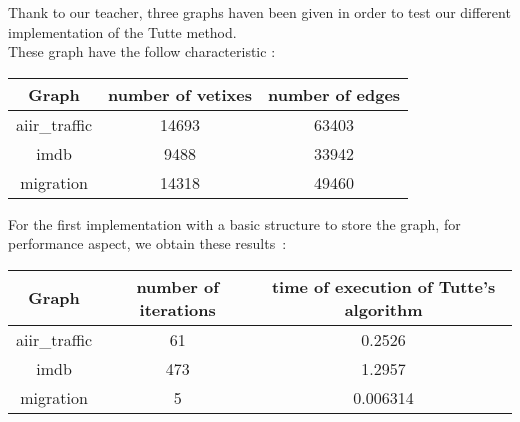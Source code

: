 
Thank to our teacher, three graphs haven been given in order to test our
different implementation of the Tutte method.\\

These graph have the follow characteristic :

\begin{center}
\begin{tabular}{|c|c|c|}
\hline
Graph & number of vetixes & number of edges \\
\hline
aiir\_traffic & 14693 & 63403\\
imdb & 9488 & 33942\\
migration & 14318 & 49460\\
\hline
\end{tabular}
\end{center}


For the first implementation with a basic structure to
store the graph, for performance aspect, we obtain these results~:

\begin{center}
\begin{tabular}{|c|c|c|}
\hline
Graph & number of iterations & time of execution of Tutte's algorithm \\
\hline
aiir\_traffic & 61 & 0.2526\\
imdb & 473 & 1.2957\\
migration & 5 & 0.006314\\
\hline
\end{tabular}
\end{center}


